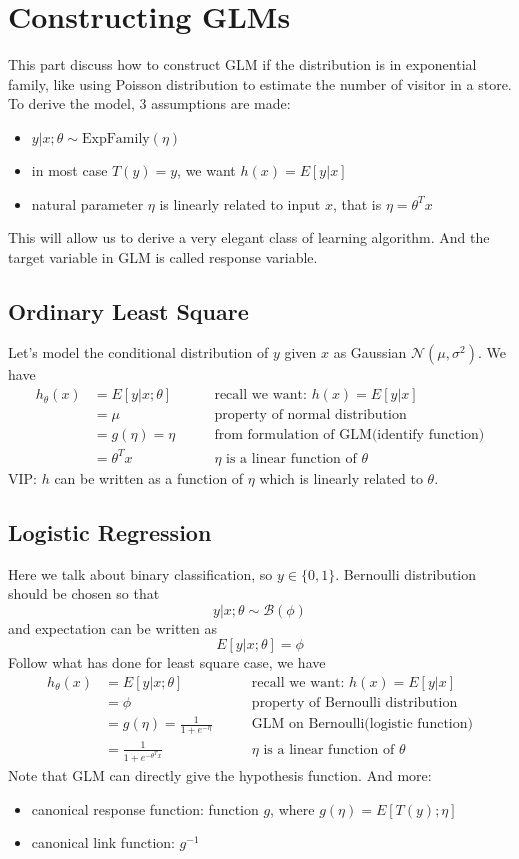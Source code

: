 \documentclass[10pt,a4paper,oneside]{article}
\begin{document}
\section{Constructing GLMs}
This part discuss how to construct GLM if the distribution is in exponential family, like using Poisson distribution to estimate the number of visitor in a store. To derive the model, $3$ assumptions are made:
\begin{itemize}
	\item $y|x; \theta \sim \text{ExpFamily}(\eta)$
	\item in most case $T(y) = y$, we want $h(x) = E[y|x]$
	\item natural parameter $\eta$ is linearly related to input $x$, that is $\eta = \theta^T x$
\end{itemize}
This will allow us to derive a very elegant class of learning algorithm. And the target variable in GLM is called response variable.
\subsection{Ordinary Least Square}
Let's model the conditional distribution of $y$ given $x$ as Gaussian $\mathcal{N}(\mu, \sigma^2)$. We have
\begin{align*}
h_\theta (x) &= E[y|x;\theta] \quad \quad &\text{recall we want: } h(x) = E[y|x]\\
&= \mu  \quad \quad &\text{property of normal distribution}\\
&= g(\eta) =  \eta \quad \quad &\text{from formulation of GLM(identify function)}\\
&= \theta^T x \quad \quad &\text{$\eta$ is a linear function of $\theta$}
\end{align*}
VIP: $h$ can be written as a function of $\eta$ which is linearly related to $\theta$.

\subsection{Logistic Regression}
Here we talk about binary classification, so $y \in \{0, 1\}$. Bernoulli distribution should be chosen so that 
\[
y|x;\theta \sim \mathcal{B}(\phi)
\]
and expectation can be written as
\[
E[y|x; \theta] = \phi
\]
Follow what has done for least square case, we have
\begin{align*}
h_\theta (x) &= E[y|x;\theta] \quad \quad &\text{recall we want: } h(x) = E[y|x]\\
&= \phi  \quad \quad &\text{property of Bernoulli distribution}\\
&= g(\eta) =  \frac{1}{1+e^{-\eta}} \quad \quad &\text{GLM on Bernoulli(logistic function)}\\
&= \frac{1}{1+e^{-\theta^T x}} \quad \quad &\text{$\eta$ is a linear function of $\theta$}
\end{align*}
Note that GLM can directly give the hypothesis function. And more:
\begin{itemize}
	\item canonical response function: function $g$, where $g(\eta) = E[T(y);\eta]$
	\item canonical link function: $g^{-1}$
\end{itemize}
\end{document}
